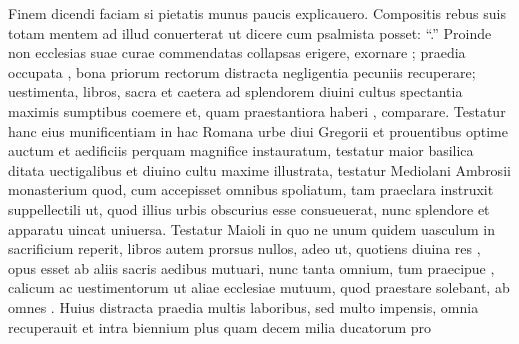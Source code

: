 \documentclass[a5paper,twoside]{article}
\begin{document}
\begin{pages}
\begin{Leftside}
Finem dicendi faciam si   pietatis munus paucis explicauero.  Compositis rebus suis totam mentem ad illud conuerterat ut dicere cum psalmista  posset: ``.''  Proinde non  ecclesias suae curae commendatas collapsas erigere, exornare ; praedia occupata , bona priorum rectorum distracta negligentia  pecuniis recuperare; uestimenta, libros,  sacra et caetera ad splendorem diuini cultus spectantia maximis sumptibus coemere et, quam praestantiora haberi , comparare.  Testatur hanc eius munificentiam in hac Romana urbe diui Gregorii  et prouentibus optime auctum et aedificiis perquam magnifice instauratum, testatur  maior basilica  ditata uectigalibus et diuino cultu maxime illustrata, testatur Mediolani Ambrosii monasterium quod, cum accepisset omnibus  spoliatum, tam praeclara instruxit suppellectili ut, quod   illius urbis obscurius esse consueuerat, nunc splendore et  apparatu uincat uniuersa. Testatur  Maioli  in quo ne unum quidem uasculum in sacrificium reperit, libros autem prorsus nullos, adeo ut, quotiens diuina res , opus esset ab aliis sacris aedibus  mutuari, nunc tanta  omnium, tum praecipue , calicum ac uestimentorum  ut aliae ecclesiae mutuum, quod praestare solebant, ab  omnes .  Huius   distracta praedia multis laboribus, sed multo  impensis, omnia recuperauit et intra biennium plus quam decem milia ducatorum pro 
\end{Leftside}
\end{pages}
\end{document}
